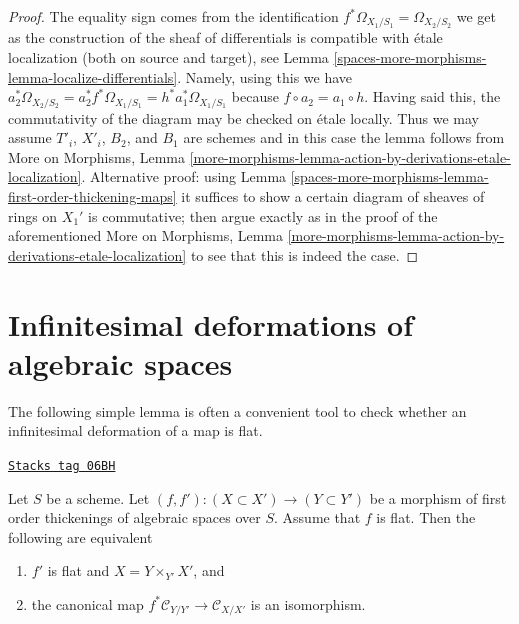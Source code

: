 \begin{proof}
The equality sign comes from the identification
$f^*\Omega_{X_1/S_1} = \Omega_{X_2/S_2}$ we get
as the construction of the sheaf of differentials is
compatible with \'etale localization (both on source and target), see
Lemma \ref{spaces-more-morphisms-lemma-localize-differentials}.
Namely, using this we have
$a_2^*\Omega_{X_2/S_2} = a_2^*f^*\Omega_{X_1/S_1} =
h^*a_1^*\Omega_{X_1/S_1}$ because $f \circ a_2 = a_1 \circ h$.
Having said this, the commutativity of the diagram may be checked
on \'etale locally. Thus we may assume $T'_i$, $X'_i$,
$B_2$, and $B_1$ are schemes and in this case the lemma
follows from
More on Morphisms, Lemma
\ref{more-morphisms-lemma-action-by-derivations-etale-localization}.
Alternative proof: using Lemma \ref{spaces-more-morphisms-lemma-first-order-thickening-maps}
it suffices to show a certain diagram of sheaves
of rings on $X_1'$ is commutative; then argue exactly
as in the proof of the aforementioned
More on Morphisms, Lemma
\ref{more-morphisms-lemma-action-by-derivations-etale-localization}
to see that this is indeed the case.
\end{proof}

\section{Infinitesimal deformations of algebraic spaces}
\label{spaces-more-morphisms-section-deform}
The following simple lemma is often a convenient tool to check whether
an infinitesimal deformation of a map is flat.

\begin{lemma}[Deform]
\label{spaces-more-morphisms-lemma-deform}
\href{https://stacks.math.columbia.edu/tag/06BH}{\texttt{Stacks tag 06BH}}

Let $S$ be a scheme. Let $(f, f') : (X \subset X') \to (Y \subset Y')$ be a
morphism of first order thickenings of algebraic spaces over $S$. Assume that
$f$ is flat. Then the following are equivalent
\begin{enumerate}
\item $f'$ is flat and $X = Y \times_{Y'} X'$, and
\item the canonical map $f^*\mathcal{C}_{Y/Y'} \to \mathcal{C}_{X/X'}$
is an isomorphism.
\end{enumerate}
\end{lemma}

